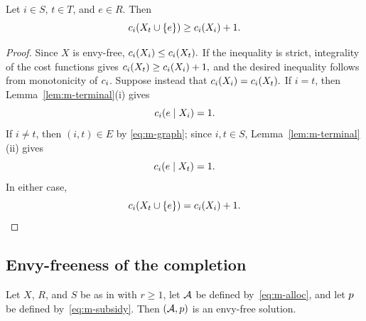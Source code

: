 \begin{lemma}
\label{lem:m-expensive}
Let $i\in S$, $t\in T$, and $e\in R$. Then
\[
    c_i(X_t\cup\left\{e\right\})\geq c_i(X_i)+1.
\]
\end{lemma}

\begin{proof}
Since $X$ is envy-free,
\( c_i(X_i)\leq c_i(X_t).
\)
If the inequality is strict, integrality of the cost functions gives
\( c_i(X_t)\geq c_i(X_i)+1,
\) and the desired inequality follows from monotonicity of $c_i$. Suppose instead that
\(
    c_i(X_i)=c_i(X_t).
\) If $i=t$, then Lemma~\ref{lem:m-terminal}(i) gives
\[
    c_i(e\mid X_i)=1.
\]
If $i\neq t$, then $(i,t)\in E$ by \eqref{eq:m-graph}; since
$i,t\in S$, Lemma~\ref{lem:m-terminal}(ii) gives
\[
    c_i(e\mid X_t)=1.
\]
In either case,
\[
    c_i(X_t\cup\left\{e\right\})=c_i(X_i)+1.
\]
\end{proof}
\subsection{Envy-freeness of the completion}
\label{sec:m-ef}
\begin{theorem}
\label{thm:m-completion}
Let $X$, $R$, and $S$ be as in  with $r\geq 1$,
let $\mathcal{A}$ be defined by~\eqref{eq:m-alloc}, and let $p$ be
defined by~\eqref{eq:m-subsidy}. Then $(\mathcal{A},p)$ is an
envy-free solution.
\end{theorem}

